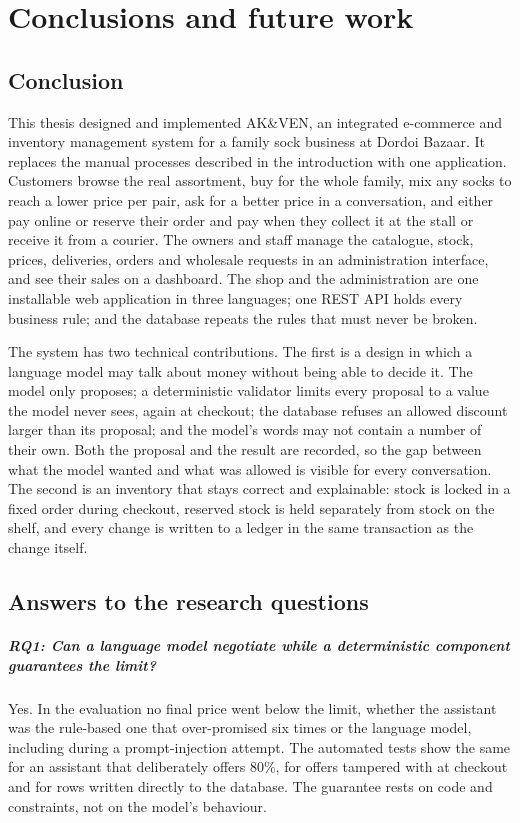 \chapter{Conclusions and future work}
\label{ch:sum}

\section{Conclusion}

This thesis designed and implemented AK\&VEN, an integrated e-commerce and inventory management system for a family
sock business at Dordoi Bazaar. It replaces the manual processes described in the introduction with one application.
Customers browse the real assortment, buy for the whole family, mix any socks to reach a lower price per pair, ask for
a better price in a conversation, and either pay online or reserve their order and pay when they collect it at the
stall or receive it from a courier. The owners and staff manage the catalogue, stock, prices, deliveries, orders and
wholesale requests in an administration interface, and see their sales on a dashboard. The shop and the administration
are one installable web application in three languages; one REST API holds every business rule; and the database
repeats the rules that must never be broken.

The system has two technical contributions. The first is a design in which a language model may talk about money
without being able to decide it. The model only proposes; a deterministic validator limits every proposal to a value
the model never sees, again at checkout; the database refuses an allowed discount larger than its proposal; and the
model's words may not contain a number of their own. Both the proposal and the result are recorded, so the gap between
what the model wanted and what was allowed is visible for every conversation. The second is an inventory that stays
correct and explainable: stock is locked in a fixed order during checkout, reserved stock is held separately from
stock on the shelf, and every change is written to a ledger in the same transaction as the change itself.

\section{Answers to the research questions}

\paragraph{RQ1: Can a language model negotiate while a deterministic component guarantees the limit?} Yes. In the
evaluation no final price went below the limit, whether the assistant was the rule-based one that over-promised six
times or the language model, including during a prompt-injection attempt. The automated tests show the same for an
assistant that deliberately offers 80\%, for offers tampered with at checkout and for rows written directly to the
database. The guarantee rests on code and constraints, not on the model's behaviour.

